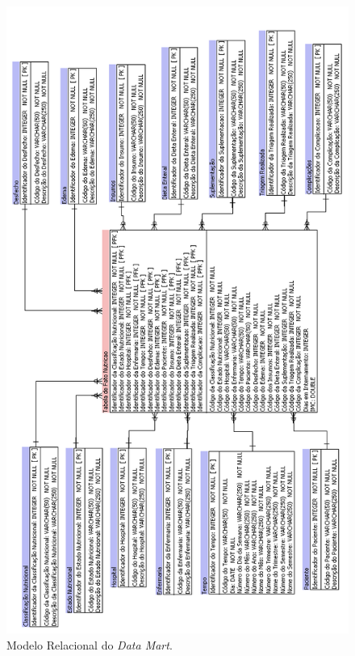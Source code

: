 \begin{figure}[htb]
	\caption{\label{fig_modelagemdatamart}Modelo Relacional do \textit{Data Mart}.}
	\begin{center}
	    \includegraphics[scale=0.59]{Imagens/figura - modelagem multidimensional datamart.png}
	\end{center}
\end{figure}

